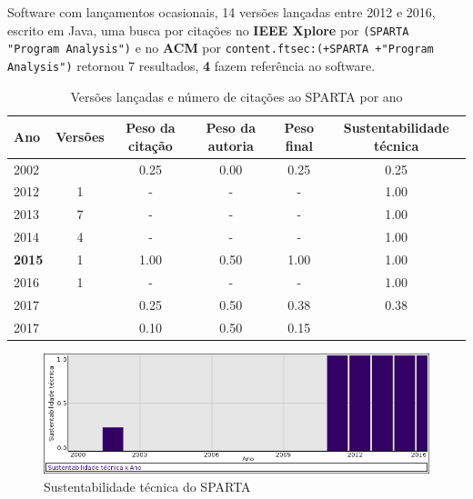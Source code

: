 Software com lançamentos ocasionais,
14 versões lançadas
entre 2012 e 2016,
escrito em Java,
uma busca por citações no {\bf IEEE Xplore} por
\texttt{(SPARTA "Program Analysis")}
e no {\bf ACM} por
\texttt{content.ftsec:(+SPARTA +"Program Analysis")}
retornou
7 resultados,
{\bf 4} fazem referência ao software.


\begin{table}[H]
\caption{Versões lançadas e número de citações ao SPARTA por ano}
\centering
\begin{tabular}{| l | c | c | c | c | c |}
  \hline
  Ano & Versões & Peso da citação & Peso da autoria & Peso final & Sustentabilidade técnica \\
  \hline
            2002
          &
          
          &
          0.25
          &
          0.00
          &
          0.25
          &
            {\color{red} 0.25}
          \\
\hline
        2012 & 1 & - & - & -
        &
          {\color{blue} 1.00}
        \\
\hline
        2013 & 7 & - & - & -
        &
          {\color{blue} 1.00}
        \\
\hline
        2014 & 4 & - & - & -
        &
          {\color{blue} 1.00}
        \\
\hline
            {\bf 2015}
          &
          1
          &
          1.00
          &
          0.50
          &
          1.00
          &
            {\color{blue} 1.00}
          \\
\hline
        2016 & 1 & - & - & -
        &
          {\color{blue} 1.00}
        \\
\hline
            2017
          &
          
          &
          0.25
          &
          0.50
          &
          0.38
          &
            {\color{red} 0.38}
          \\
            2017
          &
          
          &
          0.10
          &
          0.50
          &
          0.15
          &
          \\
\hline
\end{tabular}
\end{table}

\begin{figure}[h]
  \center
  \includegraphics[scale=0.50]{result-documents/charts/sparta.png}
  \caption{Sustentabilidade técnica do SPARTA}
\end{figure}


